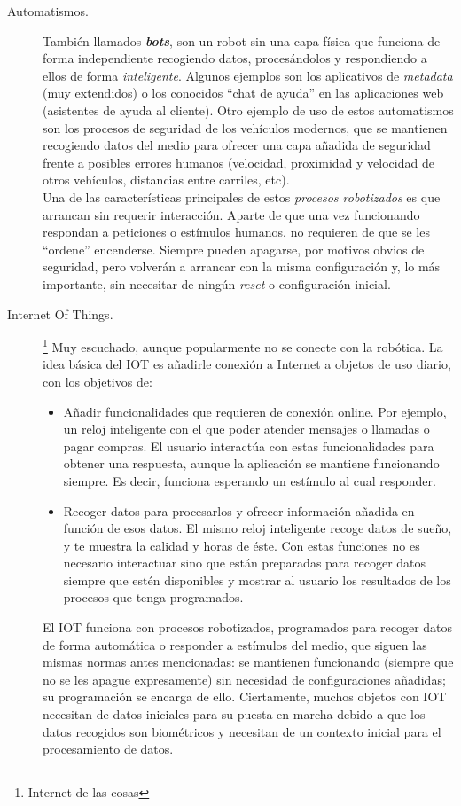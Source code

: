 \begin{description}
	\item [Automatismos.] También llamados \textit{\textbf{bots}}, son un robot sin una capa física que funciona de forma independiente recogiendo datos, procesándolos y respondiendo a ellos de forma \textit{inteligente}. Algunos ejemplos son los aplicativos de \textit{metadata} (muy extendidos) o los conocidos ``chat de ayuda'' en las aplicaciones web (asistentes de ayuda al cliente). Otro ejemplo de uso de estos automatismos son los procesos de seguridad de los vehículos modernos, que se mantienen recogiendo datos del medio  para ofrecer una capa añadida de seguridad frente a posibles errores humanos (velocidad, proximidad y velocidad de otros vehículos, distancias entre carriles, etc).\\
	Una de las características principales de estos \textit{procesos robotizados} es que arrancan sin requerir interacción. Aparte de que una vez funcionando respondan a peticiones o estímulos humanos, no requieren de que se les ``ordene'' encenderse. Siempre pueden apagarse, por motivos obvios de seguridad, pero volverán a arrancar con la misma configuración y, lo más importante, sin necesitar de ningún \textit{reset} o configuración inicial.
	
	\item [Internet Of Things.]\footnote{Internet de las cosas} Muy escuchado, aunque popularmente no se conecte con la robótica. La idea básica del IOT es añadirle conexión a Internet a objetos de uso diario, con los objetivos de:
	\begin{itemize}
		\item Añadir funcionalidades que requieren de conexión online. Por ejemplo, un reloj inteligente con el que poder atender mensajes o llamadas o pagar compras. El usuario interactúa con estas funcionalidades para obtener una respuesta, aunque la aplicación se mantiene funcionando siempre. Es decir, funciona esperando un estímulo al cual responder.
		\item Recoger datos para procesarlos y ofrecer información añadida en función de esos datos. El mismo reloj inteligente recoge datos de sueño, y te muestra la calidad y horas de éste. Con estas funciones no es necesario interactuar sino que están preparadas para recoger datos siempre que estén disponibles y mostrar al usuario los resultados de los procesos que tenga programados.
	\end{itemize}
	El IOT funciona con procesos robotizados, programados para recoger datos de forma automática o responder a estímulos del medio, que siguen las mismas normas antes mencionadas: se mantienen funcionando (siempre que no se les apague expresamente) sin necesidad de configuraciones añadidas; su programación se encarga de ello. Ciertamente, muchos objetos con IOT necesitan de datos iniciales para su puesta en marcha debido a que los datos recogidos son biométricos y necesitan de un contexto inicial para el procesamiento de datos. 
	

\end{description}

